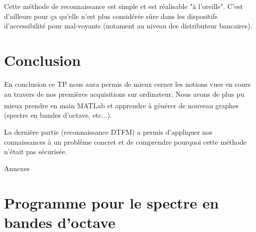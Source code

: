 \documentclass[11pt,a4paper]{article}
\begin{document}
Cette méthode de reconnaissance est simple et est réalisable "à l'oreille". C'est d'ailleurs pour ça qu'elle n'est plus
considérée sûre dans les dispositifs d'accessibilité pour mal-voyants (notament au niveau des distributeur bancaires).

\section*{Conclusion}

En conclusion ce TP nous aura permis de mieux cerner les notions vues en cours au travers de nos premières acquisitions sur ordinateur. Nous avons de plus pu mieux prendre en main MATLab\textsuperscript{\textregistered} et apprendre à générer de nouveau graphes (spectre en bandes d'octave, etc...).

La dernière partie (reconnaissance DTFM) a permis d'appliquer nos connaissances à un problème concret et de comprendre pourquoi cette méthode n'était pas sécurisée.

\newpage

\appendix
\begin{center}\Huge{Annexes}
\end{center}

\section{Programme pour le spectre en bandes d'octave}
\label{bandes}
\end{document}
